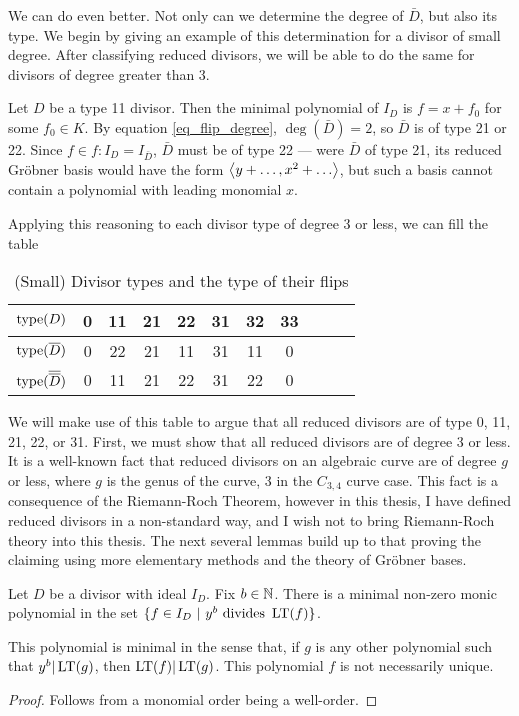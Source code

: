 We can do even better.
Not only can we determine the degree of $\bar D$, but also its type.
We begin by giving an example of this determination for a divisor of small degree.
After classifying reduced divisors, we will be able to do the same for divisors of degree greater than 3.

\begin{example}
  Let $D$ be a type 11 divisor.
  Then the minimal polynomial of $I_D$ is $f = x + f_0$ for some $f_0 \in K$.
  By equation \ref{eq_flip_degree}, $\deg(\bar D) = 2$, so $\bar D$ is of type 21 or 22.
  Since $f \in f : I_D = I_{\bar D}$, $\bar D$ must be of type 22 ---
  were $\bar D$ of type 21, its reduced Gr\"obner basis would have the form $\left\langle y + \ldots, x^2 + \ldots \right\rangle$,
  but such a basis cannot contain a polynomial with leading monomial $x$.
\end{example}

Applying this reasoning to each divisor type of degree 3 or less,
we can fill the table
\begin{table}[h]
\label{tab_small_flip_type}
\begin{center}
  \begin{tabular}{r|cccccccccc}
    $\operatorname{type}(D)$             & 0 & 11 & 21 & 22 & 31 & 32 & 33 \\
    \hline
    $\operatorname{type}(\overline D)$        & 0 & 22 & 21 & 11 & 31 & 11 & 0 \\
    $\operatorname{type}(\overline {\overline D})$ & 0 & 11 & 21 & 22 & 31 & 22 & 0
  \end{tabular}
\end{center}
\caption{(Small) Divisor types and the type of their flips}
\end{table}

We will make use of this table to argue that all reduced divisors are of type 0, 11, 21, 22, or 31.
First, we must show that all reduced divisors are of degree 3 or less.
It is a well-known fact that reduced divisors on an algebraic curve are of degree $g$ or less,
where $g$ is the genus of the curve, 3 in the $C_{3,4}$ curve case.
This fact is a consequence of the Riemann-Roch Theorem,
however in this thesis, I have defined reduced divisors in a non-standard way,
and I wish not to bring Riemann-Roch theory into this thesis.
The next several lemmas build up to that proving the claiming using more elementary methods and the theory of Gr\"obner bases.

\begin{lemma}
  Let $D$ be a divisor with ideal $I_D$.
  Fix $b \in \mathbb{N}$.
  There is a minimal non-zero monic polynomial in the set $\{ f \in I_D ~|~ y^b \text{ divides } \operatorname{LT}(f)\}$.
\end{lemma}
This polynomial is minimal in the sense that, if $g$ is any other polynomial such that $y^b|\operatorname{LT}(g)$,
then $\operatorname{LT}(f)|\operatorname{LT}(g)$.
This polynomial $f$ is not necessarily unique.
\begin{proof}
  Follows from a monomial order being a well-order.
\end{proof}

